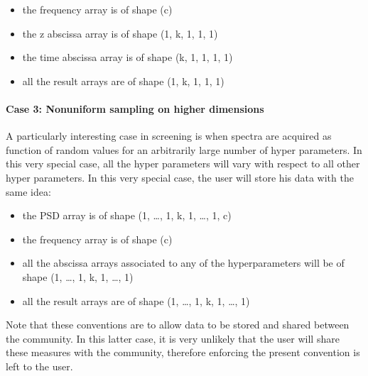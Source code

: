\documentclass[letterpaper,10pt,english]{sphinxmanual}
\begin{document}
\begin{itemize}
\begin{description}
\begin{itemize}
\item {} 
\sphinxAtStartPar
the frequency array is of shape (c)

\item {} 
\sphinxAtStartPar
the z abscissa array is of shape (1, k, 1, 1, 1)

\item {} 
\sphinxAtStartPar
the time abscissa array is of shape (k, 1, 1, 1, 1)

\item {} 
\sphinxAtStartPar
all the result arrays are of shape (1, k, 1, 1, 1)

\end{itemize}

\end{description}

\end{itemize}


\paragraph{Case 3: Non\sphinxhyphen{}uniform sampling on higher dimensions}
\label{\detokenize{source/normalization:case-3-non-uniform-sampling-on-higher-dimensions}}
\sphinxAtStartPar
A particularly interesting case in screening is when spectra are acquired as function of random values for an arbitrarily large number of hyper parameters. In this very special case, all the hyper parameters will vary with respect to all other hyper parameters. In this very special case, the user will store his data with the same idea:
\begin{itemize}
\item {} 
\sphinxAtStartPar
the PSD array is of shape (1, …, 1, k, 1, …, 1, c)

\item {} 
\sphinxAtStartPar
the frequency array is of shape (c)

\item {} 
\sphinxAtStartPar
all the abscissa arrays associated to any of the hyperparameters will be of shape (1, …, 1, k, 1, …, 1)

\item {} 
\sphinxAtStartPar
all the result arrays are of shape (1, …, 1, k, 1, …, 1)

\end{itemize}

\sphinxAtStartPar
Note that these conventions are to allow data to be stored and shared between the community. In this latter case, it is very unlikely that the user will share these measures with the community, therefore enforcing the present convention is left to the user.
\end{document}
